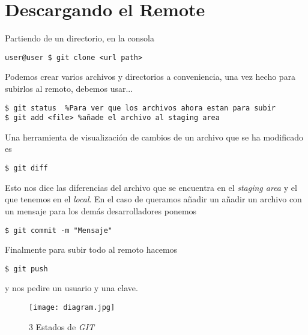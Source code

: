 \documentclass[letterpaper,12pt]{article}
\begin{document}
\section{Descargando el Remote}
Partiendo de un directorio, en la consola
\begin{verbatim}
user@user $ git clone <url path>
\end{verbatim}
Podemos crear varios archivos y directorios a conveniencia, una vez hecho para subirlos al remoto, debemos usar...
\begin{verbatim}
$ git status  %Para ver que los archivos ahora estan para subir
$ git add <file> %añade el archivo al staging area
\end{verbatim}
Una herramienta de visualización de cambios de un archivo que se ha modificado es
\begin{verbatim}
$ git diff
\end{verbatim}
Esto nos dice las diferencias del archivo que se encuentra en el \textit{staging area} y el que tenemos en el \textit{local}. En el caso de queramos añadir un añadir un archivo con un mensaje para los demás desarrolladores ponemos
\begin{verbatim}
$ git commit -m "Mensaje"
\end{verbatim}
Finalmente para subir todo al remoto hacemos 
\begin{verbatim}
$ git push
\end{verbatim}
y nos pedire un usuario y una clave.
\begin{figure}[!b]
	\centering
  \texttt{[image: diagram.jpg]}
  \caption{3 Estados de \textit{GIT}}
  \label{fig:basic}
\end{figure}
\end{document}
